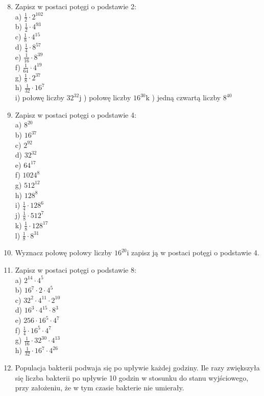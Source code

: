 \documentclass[10pt]{article}
\begin{document}
\begin{enumerate}
  \setcounter{enumi}{7}
  \item Zapisz w postaci potęgi o podstawie 2:\\
a) \(\frac{1}{2} \cdot 2^{102}\)\\
b) \(\frac{1}{2} \cdot 4^{93}\)\\
c) \(\frac{1}{8} \cdot 4^{15}\)\\
d) \(\frac{1}{4} \cdot 8^{57}\)\\
e) \(\frac{1}{16} \cdot 8^{39}\)\\
f) \(\frac{1}{64} \cdot 4^{19}\)\\
g) \(\frac{1}{8} \cdot 2^{37}\)\\
h) \(\frac{1}{32} \cdot 16^{7}\)\\
i) połowę liczby \(32^{32} \mathrm{j}\) ) połowę liczby \(16^{30} \mathrm{k}\) ) jedną czwartą liczby \(8^{40}\)
  \item Zapisz w postaci potęgi o podstawie 4:\\
a) \(8^{20}\)\\
b) \(16^{37}\)\\
c) \(2^{92}\)\\
d) \(32^{32}\)\\
e) \(64^{17}\)\\
f) \(1024^{8}\)\\
g) \(512^{12}\)\\
h) \(128^{8}\)\\
i) \(\frac{1}{4} \cdot 128^{6}\)\\
j) \(\frac{1}{8} \cdot 512^{7}\)\\
k) \(\frac{1}{8} \cdot 128^{17}\)\\
l) \(\frac{1}{8} \cdot 8^{31}\)
  \item Wyznacz połowę połowy liczby \(16^{20} \mathrm{i}\) zapisz ją w postaci potęgi o podstawie 4.
  \item Zapisz w postaci potęgi o podstawie 8:\\
a) \(2^{14} \cdot 4^{5}\)\\
b) \(16^{7} \cdot 2 \cdot 4^{5}\)\\
c) \(32^{2} \cdot 4^{11} \cdot 2^{10}\)\\
d) \(16^{3} \cdot 4^{15} \cdot 8^{3}\)\\
e) \(256 \cdot 16^{5} \cdot 4^{7}\)\\
f) \(\frac{1}{4} \cdot 16^{5} \cdot 4^{7}\)\\
g) \(\frac{1}{16} \cdot 32^{30} \cdot 4^{13}\)\\
h) \(\frac{1}{32} \cdot 16^{7} \cdot 4^{26}\)
  \item Populacja bakterii podwaja się po upływie każdej godziny. Ile razy zwiększyła się liczba bakterii po upływie 10 godzin w stosunku do stanu wyjściowego, przy założeniu, że w tym czasie bakterie nie umierały.
\end{enumerate}
\end{document}
